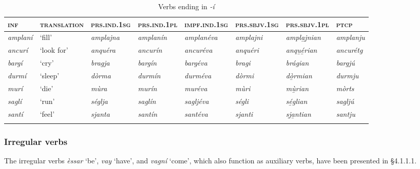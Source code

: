 \begin{sidewaystable} 
	\caption{Verbs ending in \textit{-í}}
	\label{stemalti}
	\begin{tabularx}{\textwidth}{llllllll} 
		\lsptoprule
		\textsc{\textbf{inf}} & \textsc{\textbf{translation}} & \textsc{\textbf{prs.ind.1sg}} & \textsc{\textbf{prs.ind.1pl}} & \textsc{\textbf{impf.ind.1sg}} & \textsc{\textbf{prs.sbjv.1sg}} & \textsc{\textbf{prs.sbjv.1pl}} & \textsc{\textbf{ptcp}}\\
		\midrule
		\textit{amplaní} & `fill' & \textit{amplajna} & \textit{amplanín} & \textit{amplanéva} & \textit{amplajni} & \textit{ampla̱j̱nian} & \textit{amplanju}\\
		\textit{ancurí} & `look for' & \textit{anquéra} & \textit{ancurín} &\textit{ancuréva} & \textit{anquéri} & \textit{anqu̱é̱rian} & \textit{ancurétg}\\
		\textit{bargí} & `cry' & \textit{bragja}  & \textit{bargín} & \textit{bargéva} & \textit{bragi} & \textit{brágian} & \textit{bargjú}\\
		\textit{durmí} & `sleep' & \textit{dòrma} & \textit{durmín} & \textit{durméva} & \textit{dòrmi} & \textit{dò̱rmian} & \textit{durmju}\\
		\textit{murí} & `die' & \textit{mùra} & \textit{murín} & \textit{muréva} & \textit{mùri} & \textit{mù̱rian} & \textit{mòrts}\\
		\textit{saglí} & `run' & \textit{séglja} & \textit{saglín} & \textit{sagljéva} & \textit{ségli} & \textit{sé̱glian} & \textit{sagljú}\\
		\textit{santí} & `feel' & \textit{sjanta} & \textit{santín} & \textit{santéva} & \textit{sjanti} & \textit{sj̱a̱ntian} & \textit{santju}\\
		\lspbottomrule
	\end{tabularx} 
\end{sidewaystable}


\subsubsection{Irregular verbs}
The irregular verbs \textit{èssar} `be', \textit{vay} `have', and \textit{vagní} `come',  which also function as auxiliary verbs, have been presented in §4.1.1.1.

